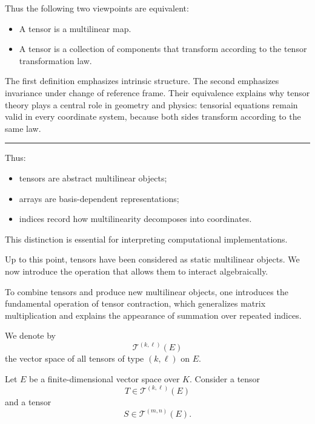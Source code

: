 \medskip

Thus the following two viewpoints are equivalent:
\begin{itemize}
\item A tensor is a multilinear map.
\item A tensor is a collection of components that transform according to the
      tensor transformation law.
\end{itemize}

The first definition emphasizes intrinsic structure.
The second emphasizes invariance under change of reference frame.
Their equivalence explains why tensor theory plays a central role in geometry
and physics: tensorial equations remain valid in every coordinate system,
because both sides transform according to the same law.

\medskip
\hrule
\bigskip

Thus:
\begin{itemize}
\item tensors are abstract multilinear objects;
\item arrays are basis-dependent representations;
\item indices record how multilinearity decomposes into coordinates.
\end{itemize}

This distinction is essential for interpreting computational implementations.

\medskip

Up to this point, tensors have been considered as static multilinear objects.
We now introduce the operation that allows them to interact algebraically.


\medskip

To combine tensors and produce new multilinear objects, one introduces the
fundamental operation of tensor contraction, which generalizes matrix
multiplication and explains the appearance of summation over repeated indices.

\medskip

We denote by
\[
\mathcal{T}^{(k,\ell)}(E)
\]
the vector space of all tensors of type $(k,\ell)$ on $E$.

\medskip

Let $E$ be a finite-dimensional vector space over $K$.
Consider a tensor
\[
T \in \mathcal{T}^{(k,\ell)}(E)
\]
and a tensor
\[
S \in \mathcal{T}^{(m,n)}(E).
\]

